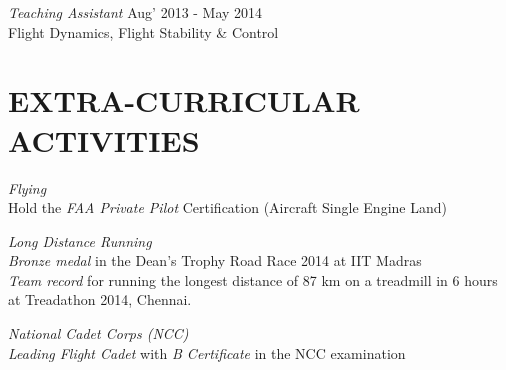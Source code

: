 \documentclass[margin, 10pt]{res} %
\begin{document}
\begin{resume}
{\sl Teaching Assistant} \hfill Aug' 2013 - May 2014 \\
Flight Dynamics, Flight Stability \& Control


\section{EXTRA-CURRICULAR ACTIVITIES} 

{\sl Flying}\\
Hold the \emph{FAA Private Pilot} Certification (Aircraft Single Engine Land)

{\sl Long Distance Running}\\
\emph{Bronze medal} in the Dean’s Trophy Road Race 2014 at IIT Madras \\ 
\emph{Team record} for running the longest distance of 87 km on a treadmill in 6 hours at Treadathon 2014,
Chennai.

{\sl National Cadet Corps (NCC)}\\
\emph{Leading Flight Cadet} with \emph{B Certificate} in the NCC examination


\end{resume}
\end{document}
